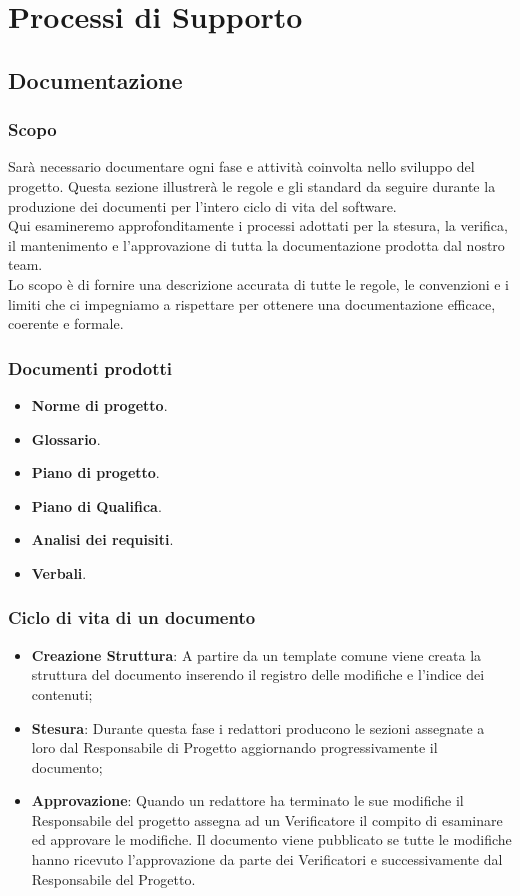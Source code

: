 \section{Processi di Supporto}

\subsection{Documentazione}
\subsubsection{Scopo}
Sarà necessario documentare ogni fase e attività coinvolta nello sviluppo del progetto. Questa sezione illustrerà le regole e gli standard da seguire durante la produzione 
dei documenti per l'intero ciclo di vita del software. \\
Qui esamineremo approfonditamente i processi adottati per la stesura, la verifica, il mantenimento e l’approvazione di tutta la documentazione prodotta dal nostro team. \\
Lo scopo è di fornire una descrizione accurata di tutte le regole, le convenzioni e i limiti che ci impegniamo a rispettare per ottenere una documentazione efficace, coerente e formale.\\

\subsubsection{Documenti prodotti}
\begin{itemize}
    \item \textbf{Norme di progetto}.
    \item \textbf{Glossario}.
    \item \textbf{Piano di progetto}.
    \item \textbf{Piano di Qualifica}.
    \item \textbf{Analisi dei requisiti}.
    \item \textbf{Verbali}.
\end{itemize}

\subsubsection{Ciclo di vita di un documento}
\begin{itemize}
    \item \textbf{Creazione Struttura}: A partire da un template comune viene creata la struttura del documento inserendo il registro delle modifiche e l’indice dei contenuti;
    \item \textbf{Stesura}: Durante questa fase i redattori producono le sezioni assegnate a loro dal Responsabile di Progetto aggiornando progressivamente il documento;
    \item \textbf{Approvazione}: Quando un redattore ha terminato le sue modifiche il Responsabile del progetto assegna ad un Verificatore il compito di esaminare ed approvare le modifiche.
Il documento viene pubblicato se tutte le modifiche hanno ricevuto l’approvazione da parte dei Verificatori e successivamente dal Responsabile del Progetto.
\end{itemize}
\newpage
